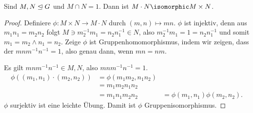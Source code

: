 \begin{lem} \label{2.4}
	Sind $M, N \trianglelefteq G$ und $M \cap N = 1$.
	Dann ist $M \cdot N \isomorphic M \times N$.
	\begin{proof}
		Definiere $\phi: M \times N \to M\cdot N$ durch $(m, n) \mapsto mn$.
		$\phi$ ist injektiv, denn aus $m_1 n_1 = m_2 n_2$ folgt $M \ni m_2^{-1} m_1 = n_2 n_1^{-1} \in N$, also $m_2^{-1}m_1 = 1 = n_2 n_1^{-1}$ und somit $m_1 = m_2 \land n_1 = n_2$.
		Zeige $\phi$ ist Gruppenhomomorphismus, indem wir zeigen, dass der  $m n m^{-1} n^{-1} = 1$, also genau dann, wenn $m n = n m$.

		Es gilt $mn m^{-1}n^{-1} \in M, N$, also $mnm^{-1}n^{-1} = 1$.
		\begin{align*}
			\phi((m_1, n_1) \cdot (m_2, n_2))
			&= \phi(m_1m_2, n_1n_2) \\
			&= m_1 m_2 n_1 n_2 \\
			&= m_1 n_1 m_2 n_2
			&= \phi(m_1, n_1) \phi(m_2, n_2).
		\end{align*}
		$\phi$ surjektiv ist eine leichte Übung.
		Damit ist $\phi$ Gruppenisomorphismus.
	\end{proof}
\end{lem}

